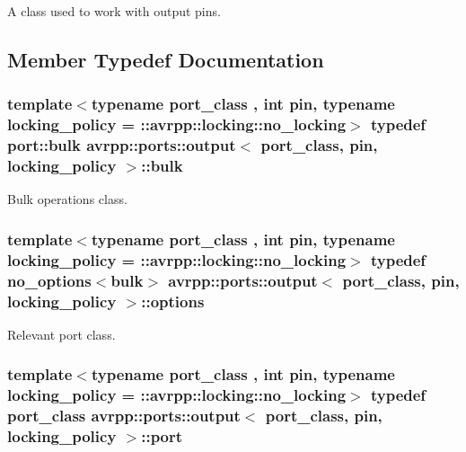 A class used to work with output pins. 

\subsection{Member Typedef Documentation}
\hypertarget{structavrpp_1_1ports_1_1output_a74c28e62f6e4fd2dc9f5c620dc66cd86}{
\subsubsection[{bulk}]{\setlength{\rightskip}{0pt plus 5cm}template$<$typename port\_\-class , int pin, typename locking\_\-policy  = ::avrpp::locking::no\_\-locking$>$ typedef port::bulk {\bf avrpp::ports::output}$<$ port\_\-class, pin, locking\_\-policy $>$::{\bf bulk}}}
\label{structavrpp_1_1ports_1_1output_a74c28e62f6e4fd2dc9f5c620dc66cd86}


Bulk operations class. 

\hypertarget{structavrpp_1_1ports_1_1output_af4681048d0ad934f06870c374fbb5402}{
\subsubsection[{options}]{\setlength{\rightskip}{0pt plus 5cm}template$<$typename port\_\-class , int pin, typename locking\_\-policy  = ::avrpp::locking::no\_\-locking$>$ typedef {\bf no\_\-options}$<${\bf bulk}$>$ {\bf avrpp::ports::output}$<$ port\_\-class, pin, locking\_\-policy $>$::{\bf options}}}
\label{structavrpp_1_1ports_1_1output_af4681048d0ad934f06870c374fbb5402}


Relevant port class. 

\hypertarget{structavrpp_1_1ports_1_1output_a978653db3f21470235358773a0209ad3}{
\subsubsection[{port}]{\setlength{\rightskip}{0pt plus 5cm}template$<$typename port\_\-class , int pin, typename locking\_\-policy  = ::avrpp::locking::no\_\-locking$>$ typedef port\_\-class {\bf avrpp::ports::output}$<$ port\_\-class, pin, locking\_\-policy $>$::{\bf port}}}
\label{structavrpp_1_1ports_1_1output_a978653db3f21470235358773a0209ad3}


